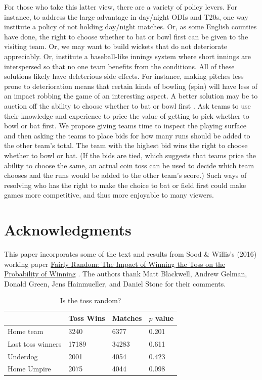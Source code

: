 \documentclass[12pt, letterpaper]{article}
\begin{document}
For those who take this latter view, there are a variety of policy levers. For instance, to address the large advantage in day/night ODIs and T20s, one way institute a policy of not holding day/night matches. Or, as some English counties have done, the right to choose whether to bat or bowl first can be given to the visiting team. Or, we may want to build wickets that do not deteriorate appreciably. Or, institute a baseball-like innings system where short innings are interspersed so that no one team benefits from the conditions. All of these solutions likely have deleterious side effects. For instance, making pitches less prone to deterioration means that certain kinds of bowling (spin) will have less of an impact robbing the game of an interesting aspect. A better solution may be to auction off the ability to choose whether to bat or bowl first \citep{sood2021}. Ask teams to use their knowledge and experience to price the value of getting to pick whether to bowl or bat first. We propose giving teams time to inspect the playing surface and then asking the teams to place bids for how many runs should be added to the other team's total. The team with the highest bid wins the right to choose whether to bowl or bat. (If the bids are tied, which suggests that teams price the ability to choose the same, an actual coin toss can be used to decide which team chooses and the runs would be added to the other team's score.) Such ways of resolving who has the right to make the choice to bat or field first could make games more competitive, and thus more enjoyable to many viewers. 

\section*{Acknowledgments}
This paper incorporates some of the text and results from Sood \& Willis's (2016) working paper \href{https://arxiv.org/abs/1605.08753}{Fairly Random: The Impact of Winning the Toss on the Probability of Winning} \citep{sood2016fairly}. The authors thank Matt Blackwell, Andrew Gelman, Donald Green, Jens Hainmueller, and Daniel Stone for their comments.
\newpage



\clearpage

\begin{table}[htb!]\centering
\caption{Is the toss random? \label{table: balance}}
\begin{tabular}{llll}
\hline
 & Toss Wins & Matches & $p$ value\\ \hline
Home team & 3240 & 6377 & 0.201\\
Last toss winners & 17189 & 34283 & 0.611\\
Underdog & 2001 & 4054 & 0.423\\
Home Umpire &  2075	& 4044	& 0.098 \\ \hline
\end{tabular}
\end{table}
\end{document}
